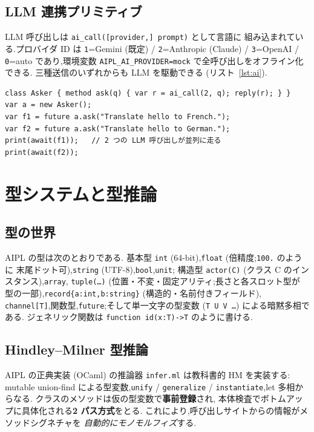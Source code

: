 \documentclass[11pt,a4paper]{article}
\newcommand{\code}[1]{\texttt{\small #1}}
\begin{document}
\subsection{LLM 連携プリミティブ}
LLM 呼び出しは \code{ai\_call([provider,] prompt)} として言語に
組み込まれている.プロバイダ ID は
\code{1}=Gemini (既定) / \code{2}=Anthropic (Claude) /
\code{3}=OpenAI / \code{0}=auto であり,環境変数
\code{AIPL\_AI\_PROVIDER=mock} で全呼び出しをオフライン化できる.
三種送信のいずれからも LLM を駆動できる (リスト~\ref{lst:ai}).

\begin{lstlisting}[caption={LLM × 未来型による並列問い合わせ},label={lst:ai},float=h]
class Asker { method ask(q) { var r = ai_call(2, q); reply(r); } }
var a = new Asker();
var f1 = future a.ask("Translate hello to French.");
var f2 = future a.ask("Translate hello to German.");
print(await(f1));   // 2 つの LLM 呼び出しが並列に走る
print(await(f2));
\end{lstlisting}

\section{型システムと型推論}\label{sec:type}

\subsection{型の世界}
AIPL の型は次のとおりである.
基本型 \code{int} (64-bit),\code{float} (倍精度;\code{100.} のように
末尾ドット可),\code{string} (UTF-8),\code{bool},\code{unit};
構造型 \code{actor(C)} (クラス C のインスタンス),\code{array},
\code{tuple(\dots)} (位置・不変・固定アリティ;長さと各スロット型が
型の一部),\code{record\{a:int,b:string\}} (構造的・名前付きフィールド),
\code{channel[T]},関数型,\code{future};そして単一文字の型変数
(\code{T U V \dots}) による暗黙多相である.
ジェネリック関数は \code{function id(x:T)->T} のように書ける.

\subsection{Hindley--Milner 型推論}\label{sec:infer}
AIPL の正典実装 (OCaml) の推論器 \code{infer.ml} は教科書的 HM を実装する:
mutable union-find による型変数,\code{unify} / \code{generalize} /
\code{instantiate},let 多相からなる.
クラスのメソッドは仮の型変数で\textbf{事前登録}され,
本体検査でボトムアップに具体化される\textbf{2 パス方式}をとる.
これにより,呼び出しサイトからの情報がメソッドシグネチャを
\emph{自動的にモノモルフィズ}する.
\end{document}
